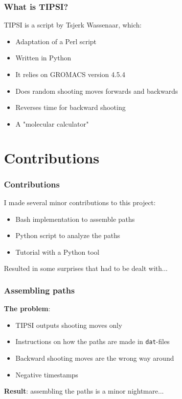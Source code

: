 \documentclass[hyperref={pdfpagelabels=false}]{beamer}
\begin{document}
\begin{frame}
\frametitle{What is \textsc{TIPSI}?} 
\textsc{TIPSI} is a script by Tsjerk Wassenaar, which:
\begin{itemize}
\item Adaptation of a Perl script
\item Written in Python
\item It relies on \textsc{GROMACS} version 4.5.4
\item Does random shooting moves forwards and backwards
\item Reverses time for backward shooting
\item A "molecular calculator"
\end{itemize}
\end{frame}

\section{Contributions}
\setcounter{subsection}{1}

\begin{frame}
\frametitle{Contributions}
I made several minor contributions to this project:
\begin{itemize}
\item Bash implementation to assemble paths
\item Python script to analyze the paths
\item Tutorial with a Python tool
\end{itemize}
Resulted in some surprises that had to be dealt with...
\end{frame}

\begin{frame}
\frametitle{Assembling paths}
\textbf{The problem}: 
\begin{itemize}
\item \textsc{TIPSI} outputs shooting moves only
\item Instructions on how the paths are made in \texttt{dat}-files
\item Backward shooting moves are the wrong way around
\item Negative timestamps
\end{itemize}
\textbf{Result}: assembling the paths is a minor nightmare...
\end{frame}
\end{document}
